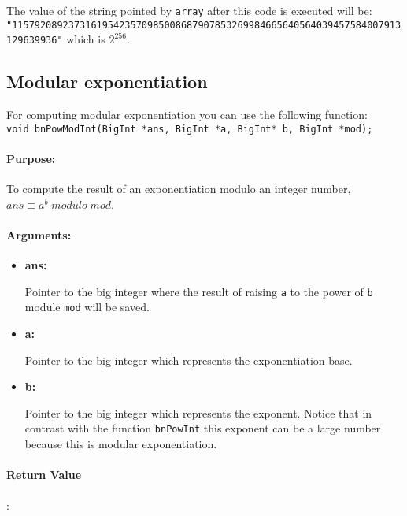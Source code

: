 \documentclass{book}
\begin{document}
The value of the string pointed by \verb+array+ after this code is executed will be:\\ 
\verb+"115792089237316195423570985008687907853269984665640564039457584007913129639936"+ which is $2^{256}$.

\subsection{Modular exponentiation}

For computing modular exponentiation you can use the following function:\\

\verb+void bnPowModInt(BigInt *ans, BigInt *a, BigInt* b, BigInt *mod);+\\

\paragraph{Purpose:} 

To compute the result of an exponentiation modulo an integer number, $ans \equiv a^b \; modulo \; mod$.

\paragraph{Arguments:}

\begin{itemize}
\item{\bf ans:}

Pointer to the big integer where the result of raising \verb+a+ to the power of \verb+b+ module \verb+mod+ will be saved.

\item {\bf a:}

Pointer to the big integer which represents the exponentiation base. 

\item {\bf b:}

Pointer to the big integer which represents the exponent. Notice that in contrast with the function \verb+bnPowInt+ this exponent can be a large number because this is modular exponentiation.

\end{itemize}

\paragraph{Return Value}:\\
\end{document}
